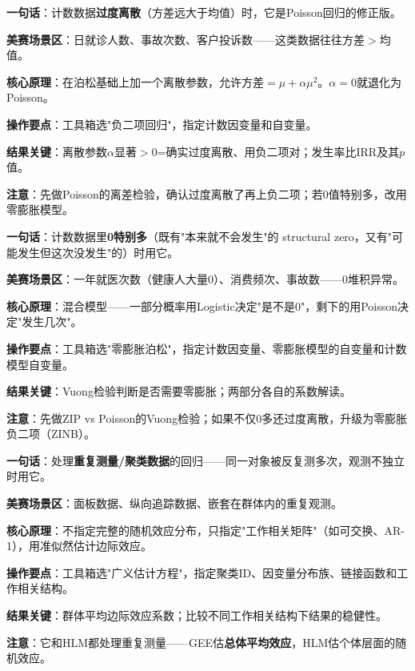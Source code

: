
\begin{algobrief}
\textbf{一句话}：计数数据\textbf{过度离散}（方差远大于均值）时，它是Poisson回归的修正版。

\textbf{美赛场景区}：日就诊人数、事故次数、客户投诉数——这类数据往往方差$>$均值。

\textbf{核心原理}：在泊松基础上加一个离散参数，允许方差$=\mu+\alpha\mu^2$。$\alpha=0$就退化为Poisson。

\textbf{操作要点}：工具箱选"负二项回归"，指定计数因变量和自变量。

\textbf{结果关键}：离散参数$\alpha$显著$>0$=确实过度离散、用负二项对；发生率比IRR及其$p$值。

\textbf{注意}：先做Poisson的离差检验，确认过度离散了再上负二项；若0值特别多，改用零膨胀模型。
\end{algobrief}


\begin{algobrief}
\textbf{一句话}：计数数据里\textbf{0特别多}（既有"本来就不会发生"的 structural zero，又有"可能发生但这次没发生"的）时用它。

\textbf{美赛场景区}：一年就医次数（健康人大量0）、消费频次、事故数——0堆积异常。

\textbf{核心原理}：混合模型——一部分概率用Logistic决定"是不是0"，剩下的用Poisson决定"发生几次"。

\textbf{操作要点}：工具箱选"零膨胀泊松"，指定计数因变量、零膨胀模型的自变量和计数模型自变量。

\textbf{结果关键}：Vuong检验判断是否需要零膨胀；两部分各自的系数解读。

\textbf{注意}：先做ZIP vs Poisson的Vuong检验；如果不仅0多还过度离散，升级为零膨胀负二项（ZINB）。
\end{algobrief}


\begin{algobrief}
\textbf{一句话}：处理\textbf{重复测量/聚类数据}的回归——同一对象被反复测多次，观测不独立时用它。

\textbf{美赛场景区}：面板数据、纵向追踪数据、嵌套在群体内的重复观测。

\textbf{核心原理}：不指定完整的随机效应分布，只指定"工作相关矩阵"（如可交换、AR-1），用准似然估计边际效应。

\textbf{操作要点}：工具箱选"广义估计方程"，指定聚类ID、因变量分布族、链接函数和工作相关结构。

\textbf{结果关键}：群体平均边际效应系数；比较不同工作相关结构下结果的稳健性。

\textbf{注意}：它和HLM都处理重复测量——GEE估\textbf{总体平均效应}，HLM估个体层面的随机效应。
\end{algobrief}

